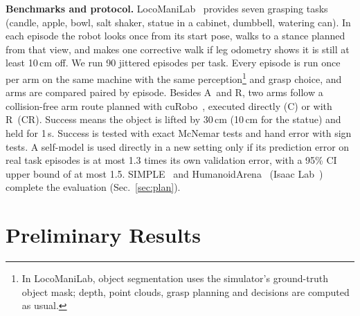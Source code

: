 \documentclass[conference]{IEEEtran}
\newcommand{\Ad}{\textsc{A}}       %
\newcommand{\Rr}{\textsc{R}}       %
\newcommand{\Croute}{\textsc{C}}   %
\newcommand{\CRr}{\textsc{CR}}     %
\begin{document}
\textbf{Benchmarks and protocol.} LocoManiLab~\cite{locomanilab} provides seven grasping tasks (candle, apple, bowl, salt shaker, statue in a cabinet, dumbbell, watering can). In each episode the robot looks once from its start pose, walks to a stance planned from that view, and makes one corrective walk if leg odometry shows it is still at least 10\,cm off. We run 90 jittered episodes per task. Every episode is run once per arm on the same machine with the same perception\footnote{In LocoManiLab, object segmentation uses the simulator's ground-truth object mask; depth, point clouds, grasp planning and decisions are computed as usual.} and grasp choice, and arms are compared paired by episode. Besides \Ad\ and \Rr, two arms follow a collision-free arm route planned with cuRobo~\cite{curobo}, executed directly (\Croute) or with \Rr\ (\CRr). Success means the object is lifted by 30\,cm (10\,cm for the statue) and held for 1\,s. Success is tested with exact McNemar tests and hand error with sign tests. A self-model is used directly in a new setting only if its prediction error on real task episodes is at most 1.3 times its own validation error, with a 95\% CI upper bound of at most 1.5. SIMPLE~\cite{simple} and HumanoidArena~\cite{humanoidarena} (Isaac Lab~\cite{isaaclab}) complete the evaluation (Sec.~\ref{sec:plan}).

\section{Preliminary Results}\label{sec:prelim}
\end{document}
